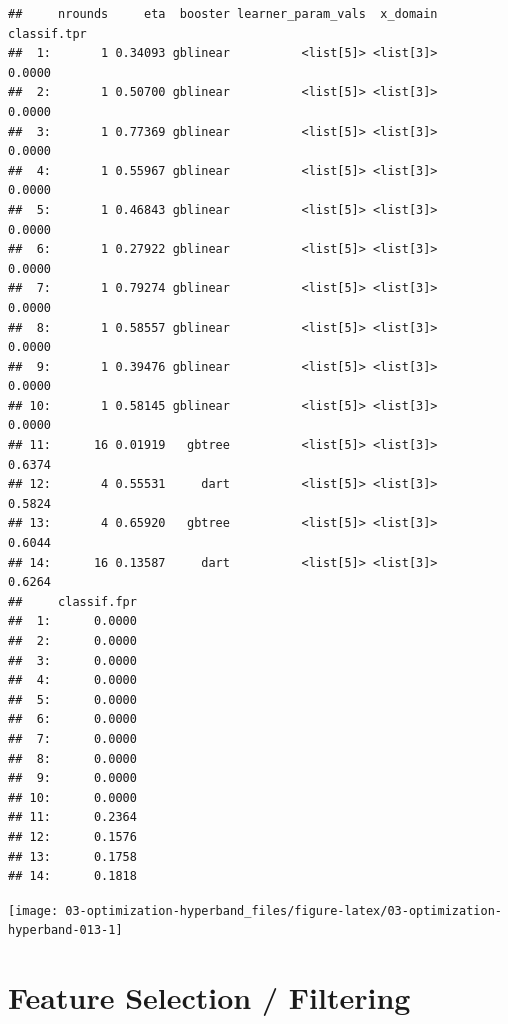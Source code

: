 \documentclass[
]{scrbook}
\newenvironment{Shaded}{\begin{snugshade}}{\end{snugshade}}
\newcommand{\AttributeTok}[1]{\textcolor[rgb]{0.77,0.63,0.00}{#1}}
\newcommand{\FunctionTok}[1]{\textcolor[rgb]{0.00,0.00,0.00}{#1}}
\newcommand{\NormalTok}[1]{#1}
\newcommand{\SpecialCharTok}[1]{\textcolor[rgb]{0.00,0.00,0.00}{#1}}
\newcommand{\StringTok}[1]{\textcolor[rgb]{0.31,0.60,0.02}{#1}}
\renewenvironment{Shaded} {\begin{snugshade}\small} {\end{snugshade}}
\begin{document}
\begin{verbatim}
##     nrounds     eta  booster learner_param_vals  x_domain classif.tpr
##  1:       1 0.34093 gblinear          <list[5]> <list[3]>      0.0000
##  2:       1 0.50700 gblinear          <list[5]> <list[3]>      0.0000
##  3:       1 0.77369 gblinear          <list[5]> <list[3]>      0.0000
##  4:       1 0.55967 gblinear          <list[5]> <list[3]>      0.0000
##  5:       1 0.46843 gblinear          <list[5]> <list[3]>      0.0000
##  6:       1 0.27922 gblinear          <list[5]> <list[3]>      0.0000
##  7:       1 0.79274 gblinear          <list[5]> <list[3]>      0.0000
##  8:       1 0.58557 gblinear          <list[5]> <list[3]>      0.0000
##  9:       1 0.39476 gblinear          <list[5]> <list[3]>      0.0000
## 10:       1 0.58145 gblinear          <list[5]> <list[3]>      0.0000
## 11:      16 0.01919   gbtree          <list[5]> <list[3]>      0.6374
## 12:       4 0.55531     dart          <list[5]> <list[3]>      0.5824
## 13:       4 0.65920   gbtree          <list[5]> <list[3]>      0.6044
## 14:      16 0.13587     dart          <list[5]> <list[3]>      0.6264
##     classif.fpr
##  1:      0.0000
##  2:      0.0000
##  3:      0.0000
##  4:      0.0000
##  5:      0.0000
##  6:      0.0000
##  7:      0.0000
##  8:      0.0000
##  9:      0.0000
## 10:      0.0000
## 11:      0.2364
## 12:      0.1576
## 13:      0.1758
## 14:      0.1818
\end{verbatim}

\begin{Shaded}
\end{Shaded}

\begin{center}\texttt{[image: 03-optimization-hyperband\_files/figure-latex/03-optimization-hyperband-013-1]} \end{center}

\hypertarget{fs}{%
\section{Feature Selection / Filtering}\label{fs}}
\end{document}
